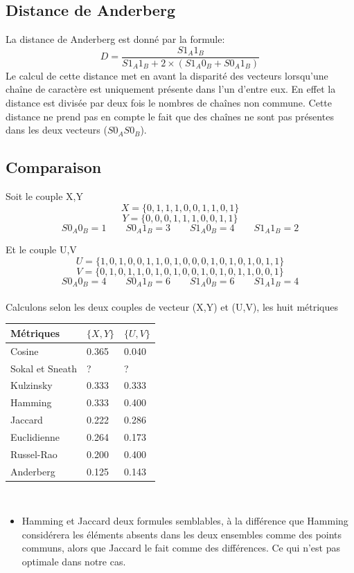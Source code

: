 \documentclass[11pt]{article}
\begin{document}
\subsection{Distance de Anderberg}
La distance de Anderberg est donné par la formule:
\begin{equation}
   D = \frac{S1_{A}1_{B}}{S1_{A}1_{B} + 2\times(S1_{A}0_{B}+S0_{A}1_{B})}
\end{equation}
Le calcul de cette distance met en avant la disparité des vecteurs lorsqu'une chaîne de caractère est uniquement présente dans l'un d'entre eux. En effet la distance est divisée par deux fois le nombres de chaînes non commune. Cette distance ne prend pas en compte le fait que des chaînes ne sont pas présentes dans les deux vecteurs ($S0_{A}S0_{B}$).

\subsection{Comparaison}


Soit le couple X,Y
\[
   X = \{0,1,1,1,0,0,1,1,0,1\}
\]
\[
  Y = \{0,0,0,1,1,1,0,0,1,1\} 
\]
\[
S0_{A}0_{B}=1 \qquad
S0_{A}1_{B}=3 \qquad
S1_{A}0_{B}=4 \qquad
S1_{A}1_{B}=2
\]

Et le couple U,V
\[
   U = \{1,0,1,0,0,1,1,0,1,0,0,0,1,0,1,0,1,0,1,1\}
\]
\[
   V = \{0,1,0,1,1,0,1,0,1,0,0,1,0,1,0,1,1,0,0,1\}
\]
\[
S0_{A}0_{B}=4  \qquad
S0_{A}1_{B}=6  \qquad
S1_{A}0_{B}=6  \qquad
S1_{A}1_{B}=4
\]
\\
Calculons selon les deux couples de vecteur (X,Y) et (U,V), les huit métriques

\begin{tabular}{|l|l|l|}
    \hline
   Métriques & $\{X,Y\}$ & $\{U,V\}$\\
   \hline
   Cosine & 0.365 & 0.040\\
   \hline
   Sokal et Sneath & ? & ?\\
   \hline
   Kulzinsky & 0.333 & 0.333\\
   \hline
   Hamming & 0.333 & 0.400\\
   \hline
   Jaccard & 0.222 & 0.286\\
   \hline
   Euclidienne & 0.264 & 0.173\\
   \hline
   Russel-Rao & 0.200 & 0.400\\
   \hline
   Anderberg & 0.125 & 0.143\\
   \hline
\end{tabular}\\

\begin{itemize}
\item Hamming et Jaccard deux formules semblables, à la différence que Hamming considérera les éléments absents dans les deux ensembles comme des points communs, alors que Jaccard le fait comme des différences. Ce qui n'est pas optimale dans notre cas.

\end{itemize}
\end{document}
